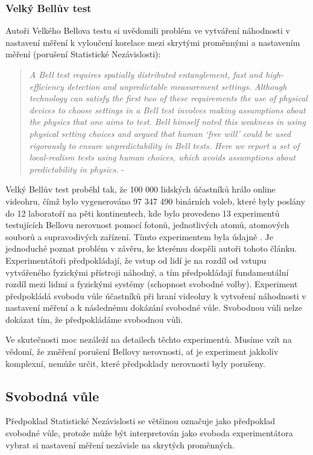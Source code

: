 \subsubsection{Velký Bellův test}
Autoři Velkého Bellova testu si uvědomili problém ve vytváření náhodnosti v nastavení měření k vyloučení korelace mezi skrytými proměnnými a nastavením měření (porušení Statistické Nezávislosti):
\begin{quote}
    \emph{A Bell test requires spatially distributed entanglement, fast and high-efficiency detection and unpredictable measurement settings. Although technology can satisfy the first two of these requirements the use of physical devices to choose settings in a Bell test involves making assumptions about the physics that one aims to test. Bell himself noted this weakness in using physical setting choices and argued that human ‘free will’ could be used rigorously to ensure unpredictability in Bell tests. Here we report a set of local-realism tests using human choices, which avoids assumptions about predictability in physics.} - \cite{BigBTest}
\end{quote}

Velký Bellův test proběhl tak, že 100 000 lidských účastníků hrálo online videohru, čímž bylo vygenerováno 97 347 490 binárních voleb, které byly poslány do 12 laboratoří na pěti kontinentech, kde bylo provedeno 13 experimentů testujících Bellovu nerovnost pomocí fotonů, jednotlivých atomů, atomových souborů a supravodivých zařízení. Tímto experimentem byla údajně . Je jednoduché poznat problém v závěru, ke kterému dospěli autoři tohoto článku. Experimentátoři předpokládají, že vstup od lidí je na rozdíl od vstupu vytvářeného fyzickými přístroji náhodný, a tím předpokládají fundamentální rozdíl mezi lidmi a fyzickými systémy (schopnost svobodné volby). Experiment předpokládá svobodu vůle účastníků při hraní videohry k vytvoření náhodnosti v nastavení měření a k následnému dokázání svobodné vůle. Svobodnou vůli nelze dokázat tím, že předpokládáme svobodnou vůli.

Ve skutečnosti moc nezáleží na detailech těchto experimentů. Musíme vzít na vědomí, že změření porušení Bellovy nerovnosti, ať je experiment jakkoliv komplexní, nemůže určit, které předpoklady nerovnosti byly porušeny.

\clearpage

\subsection{Svobodná vůle}
Předpoklad Statistické Nezávislosti se většinou označuje jako předpoklad svobodné vůle, protože může být interpretován jako svoboda experimentátora vybrat si nastavení měření nezávisle na skrytých proměnných.

